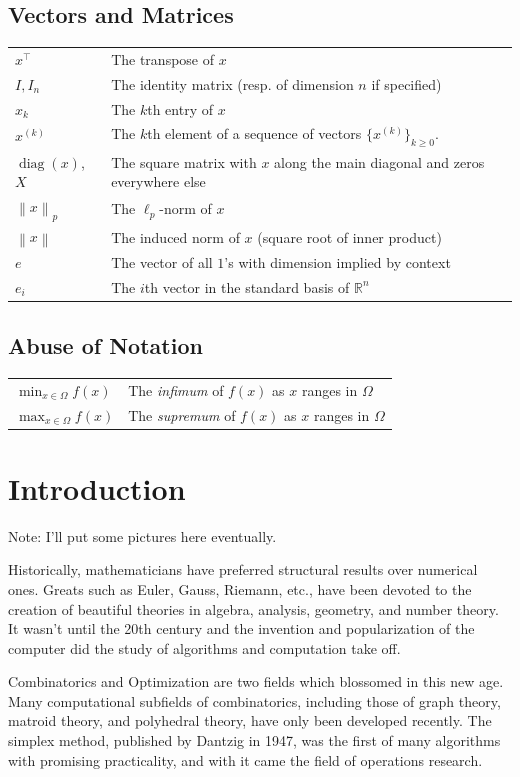 \documentclass[11pt]{article}
\numberwithin{equation}{section}
\theoremstyle{definition}
\newcommand{\bR}{\mathbb{R}}
\newcommand{\norm}[1]{\left\lVert#1\right\rVert}
\newcommand{\diag}{\operatorname{diag}}
\begin{document}
\subsection*{Vectors and Matrices}
\begin{tabular}{p{2cm}p{11.75cm}}
$x^\top$ & The transpose of $x$\\
$I, I_n$ & The identity matrix (resp. of dimension $n$ if specified)\\
$x_k$ & The $k$th entry of $x$\\
$x^{(k)}$ & The $k$th element of a sequence of vectors $\{x^{(k)}\}_{k\ge0}$.\\
$\diag(x)$, $X$ & The square matrix with $x$ along the main diagonal and zeros everywhere else\\
$\norm x_p$ & The $\ell_p$-norm of $x$\\
$\norm x$ & The induced norm of $x$ (square root of inner product)\\
$e$ & The vector of all $1$'s with dimension implied by context\\
$e_i$ & The $i$th vector in the standard basis of $\bR^n$\\
\end{tabular}
\subsection*{Abuse of Notation}
\begin{tabular}{p{2cm}p{11.75cm}}
$\min_{x\in\Omega}f(x)$ & The \textit{infimum} of $f(x)$ as $x$ ranges in $\Omega$\\
$\max_{x\in\Omega}f(x)$ & The \textit{supremum} of $f(x)$ as $x$ ranges in $\Omega$\\
\end{tabular}
\newpage
\section*{Introduction}
Note: I'll put some pictures here eventually.

Historically, mathematicians have preferred structural results over numerical ones. Greats such as Euler, Gauss, Riemann, etc., have been devoted to the creation of beautiful theories in algebra, analysis, geometry, and number theory. It wasn't until the 20th century and the invention and popularization of the computer did the study of algorithms and computation take off.

Combinatorics and Optimization are two fields which blossomed in this new age. Many computational subfields of combinatorics, including those of graph theory, matroid theory, and polyhedral theory, have only been developed recently. The simplex method, published by Dantzig in 1947, was the first of many algorithms with promising practicality, and with it came the field of operations research.
\end{document}

